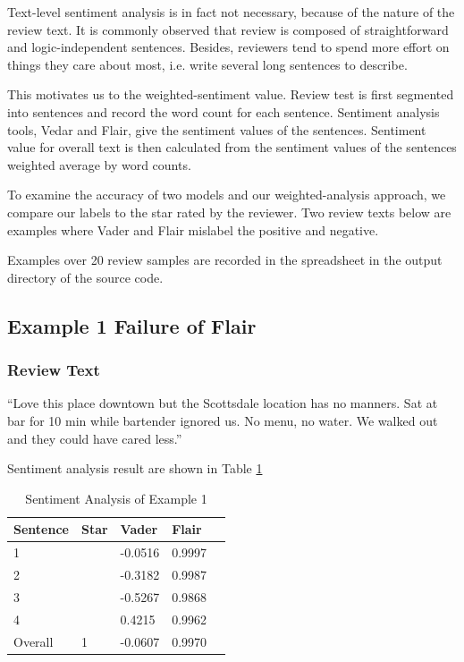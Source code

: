 \documentclass[sigconf]{acmart}
\begin{document}
Text-level sentiment analysis is in fact not necessary, because of the nature of the review text. It is commonly observed that review is composed of straightforward and logic-independent sentences. Besides, reviewers tend to spend more effort on things they care about most, i.e. write several long sentences to describe.

This motivates us to the weighted-sentiment value. Review test is first segmented into sentences and record the word count for each sentence. Sentiment analysis tools, Vedar and Flair, give the sentiment values of the sentences. Sentiment value for overall text is then calculated from the sentiment values of the sentences weighted average by word counts.

To examine the accuracy of two models and our weighted-analysis approach, we compare our labels to the star rated by the reviewer. Two review texts below are examples where Vader and Flair mislabel the positive and negative.

Examples over 20 review samples are recorded in the spreadsheet in the output directory of the source code.

\subsection{Example 1 Failure of Flair}
\subsubsection{Review Text}“Love this place downtown but the Scottsdale location has no manners. Sat at bar for 10 min while bartender ignored us. No menu, no water. We walked out and they could have cared less.”

Sentiment analysis result are shown in Table \ref{tab:eg1}
\begin{table}
  \caption{Sentiment Analysis of Example 1}
  \label{tab:eg1}
  \begin{tabular}{lllll}
    \toprule
    Sentence & Star & Vader & Flair \\
    \midrule
    1 & & -0.0516 & 0.9997\\
    2 & & -0.3182 & 0.9987\\
    3 & & -0.5267 & 0.9868\\
    4 & & 0.4215 & 0.9962\\
    \bottomrule
    Overall & 1 & -0.0607 & 0.9970\\
\end{tabular}
\end{table}
\end{document}
